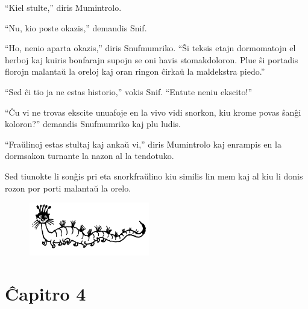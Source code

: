``Kiel stulte,'' diris Mumintrolo.

``Nu, kio poste okazis,'' demandis Snif.

``Ho, nenio aparta okazis,'' diris Snufmumriko. ``Ŝi teksis etajn dormomatojn el herboj kaj kuiris bonfarajn supojn se oni havis stomakdoloron. Plue ŝi portadis florojn malantaŭ la oreloj kaj oran ringon ĉirkaŭ la maldekstra piedo.''

``Sed ĉi tio ja ne estas historio,'' vokis Snif. ``Entute neniu ekscito!''

``Ĉu vi ne trovas ekscite unuafoje en la vivo vidi snorkon, kiu krome povas ŝanĝi koloron?'' demandis Snufmumriko kaj plu ludis.

``Fraŭlinoj estas stultaj kaj ankaŭ vi,'' diris Mumintrolo kaj enrampis en la dormsakon turnante la nazon al la tendotuko.

Sed tiunokte li sonĝis pri eta snorkfraŭlino kiu similis lin mem kaj al kiu li donis rozon por porti malantaŭ la orelo.

\begin{figure}[htbp]
\centering
\includegraphics[width=150pt,height=66pt]{3-14.png}
\caption{}
\label{3-14}
\end{figure}

\chapter[Ĉapitro 4]{Ĉapitro 4}

